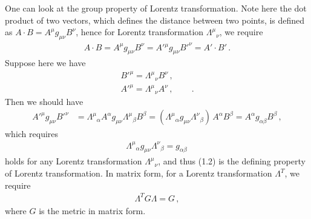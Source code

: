 \documentclass[11pt, onesided]{book}
\theoremstyle{break}
\theoremstyle{break}
\begin{document}
One can look at the group property of Lorentz transformation. Note here the dot product of two vectors, which defines the distance between two points, is defined as $A\cdot B = A^\mu g_{\mu\nu} B^\nu$, hence for Lorentz transformation $\Lambda^\mu{}_\nu$, we require 
\begin{align*}
A\cdot B = A^\mu g_{\mu \nu} B^\nu = A'{}^\mu g_{\mu \nu} B'^\nu = A' \cdot B'\,.
\end{align*}
Suppose here we have
\begin{align*}
B'^\mu = \Lambda^\mu{}_\nu B^\nu\,,\qquad \\
A'^\mu = \Lambda^\mu{}_\nu A^\nu\,,\qquad\,. 
\end{align*}
Then we should have
\begin{align*}
A'^\mu g_{\mu \nu} B'^\nu 
&= \Lambda^\mu{}_\alpha A^\alpha g_{\mu \nu} \Lambda^\mu{}_\beta B^\beta
= (\Lambda^\mu{}_\alpha g_{\mu\nu} \Lambda^\nu{}_\beta)\,A^\alpha B^\beta = A^\alpha g_{\alpha\beta} B^\beta\,,
\end{align*}
which requires
\begin{align}
\Lambda^\mu{}_\alpha g_{\mu\nu} \Lambda^\nu{}_\beta = g_{\alpha \beta}\,
\end{align}
holds for any Lorentz transformation $\Lambda^\mu{}_\nu$, and thus (1.2) is the defining property of Lorentz transformation. In matrix form, for a Lorentz transformation $\Lambda^T$, we require
\begin{align*}
\Lambda^T G\Lambda = G\,,
\end{align*}
where $G$ is the metric in matrix form.\\
\end{document}
